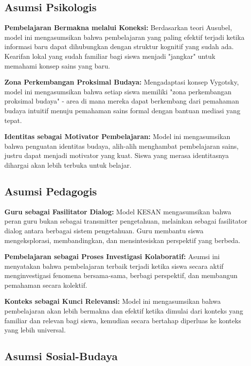 \documentclass[12pt,a4paper,oneside]{book}
\begin{document}
\subsection{Asumsi Psikologis}

\textbf{Pembelajaran Bermakna melalui Koneksi:} Berdasarkan teori Ausubel, model ini mengasumsikan bahwa pembelajaran yang paling efektif terjadi ketika informasi baru dapat dihubungkan dengan struktur kognitif yang sudah ada. Kearifan lokal yang sudah familiar bagi siswa menjadi "jangkar" untuk memahami konsep sains yang baru.

\textbf{Zona Perkembangan Proksimal Budaya:} Mengadaptasi konsep Vygotsky, model ini mengasumsikan bahwa setiap siswa memiliki "zona perkembangan proksimal budaya" - area di mana mereka dapat berkembang dari pemahaman budaya intuitif menuju pemahaman sains formal dengan bantuan mediasi yang tepat.

\textbf{Identitas sebagai Motivator Pembelajaran:} Model ini mengasumsikan bahwa penguatan identitas budaya, alih-alih menghambat pembelajaran sains, justru dapat menjadi motivator yang kuat. Siswa yang merasa identitasnya dihargai akan lebih terbuka untuk belajar.

\subsection{Asumsi Pedagogis}

\textbf{Guru sebagai Fasilitator Dialog:} Model KESAN mengasumsikan bahwa peran guru bukan sebagai transmitter pengetahuan, melainkan sebagai fasilitator dialog antara berbagai sistem pengetahuan. Guru membantu siswa mengeksplorasi, membandingkan, dan mensintesiskan perspektif yang berbeda.

\textbf{Pembelajaran sebagai Proses Investigasi Kolaboratif:} Asumsi ini menyatakan bahwa pembelajaran terbaik terjadi ketika siswa secara aktif menginvestigasi fenomena bersama-sama, berbagi perspektif, dan membangun pemahaman secara kolektif.

\textbf{Konteks sebagai Kunci Relevansi:} Model ini mengasumsikan bahwa pembelajaran akan lebih bermakna dan efektif ketika dimulai dari konteks yang familiar dan relevan bagi siswa, kemudian secara bertahap diperluas ke konteks yang lebih universal.

\subsection{Asumsi Sosial-Budaya}
\end{document}
